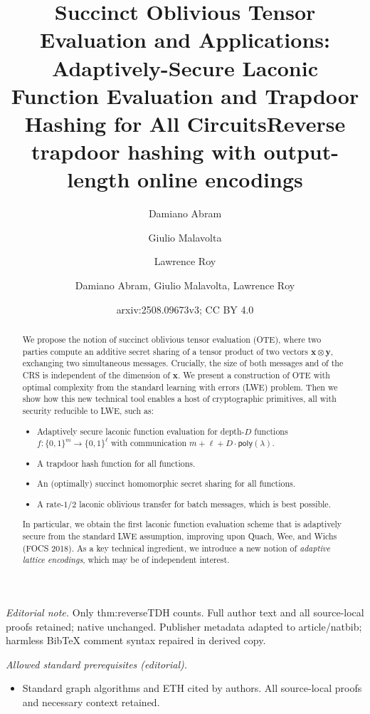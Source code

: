 \documentclass{article}
\author{Damiano Abram \and Giulio Malavolta \and Lawrence Roy}\date{}
\title{Succinct Oblivious Tensor Evaluation and Applications: Adaptively-Secure Laconic Function Evaluation and Trapdoor Hashing for All Circuits}
\title{Reverse trapdoor hashing with output-length online encodings}
\author{Damiano Abram, Giulio Malavolta, Lawrence Roy}
\date{arxiv:2508.09673v3; CC BY 4.0}
\newcommand{\poly}{\mathsf{poly}}
\renewcommand{\sec}{\ensuremath{\lambda}}
\begin{document}
\maketitle
\noindent\textit{Editorial note.} Only thm:reverseTDH counts. Full author text and all source-local proofs retained; native unchanged. Publisher metadata adapted to article/natbib; harmless BibTeX comment syntax repaired in derived copy.\par\medskip
\noindent\textit{Allowed standard prerequisites (editorial).}\begin{itemize}
\item Standard graph algorithms and ETH cited by authors. All source-local proofs and necessary context retained.
\end{itemize}\medskip

\maketitle
\begin{abstract}
    We propose the notion of succinct oblivious tensor evaluation (OTE), where two parties compute an additive secret sharing of a tensor product of two vectors $\mathbf{x} \otimes \mathbf{y}$, exchanging two simultaneous messages. Crucially, the size of both messages and of the CRS is independent of the dimension of $\mathbf{x}$.
    We present a construction of OTE with optimal complexity from the standard learning with errors (LWE) problem. Then we show how this new technical tool enables a host of cryptographic primitives, all with security reducible to LWE, such as:
    \begin{itemize}
        \item Adaptively secure laconic function evaluation for depth-$D$ functions $f:\{0, 1\}^m\rightarrow\{0, 1\}^\ell$ with communication $m+\ell+ D\cdot\poly(\sec)$.
        \item A trapdoor hash function for all functions.
        \item An (optimally) succinct homomorphic secret sharing for all functions.
        \item A rate-$1/2$ laconic oblivious transfer for batch messages, which is best possible.
    \end{itemize}
    In particular, we obtain the first laconic function evaluation scheme that is adaptively secure from the standard LWE assumption, improving upon Quach, Wee, and Wichs (FOCS 2018). 
    As a key technical ingredient, we introduce a new notion of \emph{adaptive lattice encodings}, which may be of independent interest.
\end{abstract}
\end{document}
